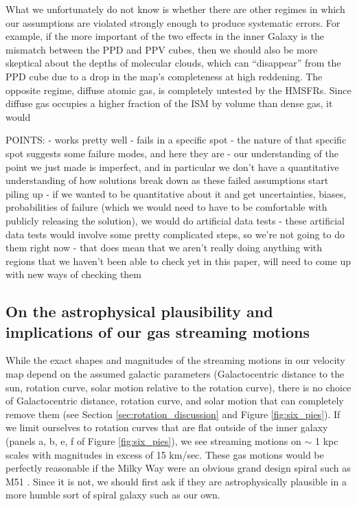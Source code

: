 What we unfortunately do not know is whether there are other regimes in which our assumptions are violated strongly enough to produce systematic errors. 
For example, if the more important of the two effects in the inner Galaxy is the mismatch between the PPD and PPV cubes, then we should also be more skeptical about the depths of molecular clouds, which can ``disappear'' from the PPD cube due to a drop in the map's completeness at high reddening.
The opposite regime, diffuse atomic gas, is completely untested by the HMSFRs.
Since diffuse gas occupies a higher fraction of the ISM by volume than dense gas, it would 


POINTS:
    - works pretty well
    - fails in a specific spot
    - the nature of that specific spot suggests some failure modes, and here they are
    - our understanding of the point we just made is imperfect, and in particular we don't have a quantitative understanding of how solutions break down as these failed assumptions start piling up
    - if we wanted to be quantitative about it and get uncertainties, biases, probabilities of failure (which we would need to have to be comfortable with publicly releasing the solution), we would do artificial data tests
    - these artificial data tests would involve some pretty complicated steps, so we're not going to do them right now
    - that does mean that we aren't really doing anything with regions that we haven't been able to check yet in this paper, will need to come up with new ways of checking them



\subsection{On the astrophysical plausibility and implications of our gas streaming motions}
\label{sec:discussion-plausibility}
While the exact shapes and magnitudes of the streaming motions in our velocity map depend on the assumed galactic parameters (Galactocentric distance to the sun, rotation curve, solar motion relative to the rotation curve), there is no choice of Galactocentric distance, rotation curve, and solar motion that can completely remove them (see Section \ref{sec:rotation_discussion} and Figure \ref{fig:six_pies}).
If we limit ourselves to rotation curves that are flat outside of the inner galaxy (panels a, b, e, f of Figure \ref{fig:six_pies}), we see streaming motions on $\sim$ 1 kpc scales with magnitudes in excess of 15 km/sec. 
These gas motions would be perfectly reasonable if the Milky Way were an obvious grand design spiral such as M51 \citep{Meidt_2013}. 
Since it is not, we should first ask if they are astrophysically plausible in a more humble sort of spiral galaxy such as our own. 

